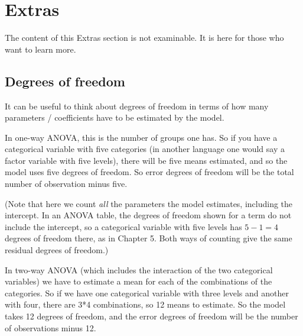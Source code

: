 \documentclass[
  letterpaper,
  8pt,
  a4paper]{book}
\begin{document}
\section*{Extras}\label{extras-5}


\begin{tcolorbox}[enhanced jigsaw, arc=.35mm, bottomrule=.15mm, bottomtitle=1mm, breakable, colback=white, colbacktitle=quarto-callout-note-color!10!white, colframe=quarto-callout-note-color-frame, coltitle=black, left=2mm, leftrule=.75mm, opacityback=0, opacitybacktitle=0.6, rightrule=.15mm, title=\textcolor{quarto-callout-note-color}{\faInfo}\hspace{0.5em}{Note}, titlerule=0mm, toprule=.15mm, toptitle=1mm]

The content of this Extras section is not examinable. It is here for
those who want to learn more.

\end{tcolorbox}

\subsection*{Degrees of freedom}\label{degrees-of-freedom}

It can be useful to think about degrees of freedom in terms of how many
parameters / coefficients have to be estimated by the model.

In one-way ANOVA, this is the number of groups one has. So if you have a
categorical variable with five categories (in another language one would
say a factor variable with five levels), there will be five means
estimated, and so the model uses five degrees of freedom. So error
degrees of freedom will be the total number of observation minus five.

(Note that here we count \emph{all} the parameters the model estimates,
including the intercept. In an ANOVA table, the degrees of freedom shown
for a term do not include the intercept, so a categorical variable with
five levels has \(5 - 1 = 4\) degrees of freedom there, as in Chapter 5.
Both ways of counting give the same residual degrees of freedom.)

In two-way ANOVA (which includes the interaction of the two categorical
variables) we have to estimate a mean for each of the combinations of
the categories. So if we have one categorical variable with three levels
and another with four, there are 3*4 combinations, so 12 means to
estimate. So the model takes 12 degrees of freedom, and the error
degrees of freedom will be the number of observations minus 12.
\end{document}
